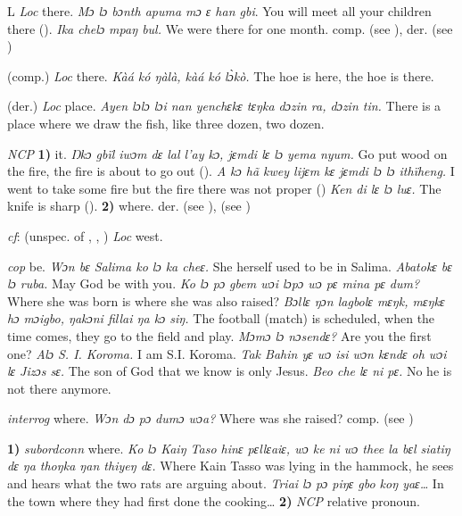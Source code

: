 \begin{letter}{L}
 \textit{Loc} there. \textit{Mɔ lɔ bɔnth apuma mɔ ɛ han gbi}. You will meet all your children there (\citealt{Pichl1967}). \textit{Ika chelɔ mpaŋ bul.} We were there for one month. comp.  (see ), der.  (see ) 

 (comp.) \textit{Loc} there. \textit{Kàá kó ŋàlà, kàá kó lɔ̀kò.} The hoe is here, the hoe is there.

 (der.) \textit{Loc} place. \textit{Ayen lɔlɔ lɔi nan yenchɛkɛ tɛŋka dɔzin ra, dɔzin tin.} There is a place where we draw the fish, like three dozen, two dozen.

 \textit{NCP} \textbf{1)} it. \textit{Ŋkɔ gbïl iwɔm dɛ lal l'ay kɔ, jɛmdi lɛ lɔ yema nyum.} Go put wood on the fire, the fire is about to go out (\citealt{Pichl1967}). \textit{A kɔ hã kwey lijɛm kɛ jɛmdi lɔ lɔ ithïheng.} I went to take some fire but the fire there was not proper (\citealt{Pichl1967}) \textit{Ken di lɛ lɔ luɛ.} The knife is sharp (\citealt{Pichl1967}). \textbf{2)} where. der.  (see ),  (see ) 

 \textit{cf}:  (unspec. of , , ) \textit{Loc} west.

 \textit{cop} be. \textit{Wɔn bɛ Salima ko lɔ ka cheɛ.} She herself used to be in Salima. \textit{Abatokɛ bɛ lɔ ruba.} May God be with you. \textit{Ko lɔ pɔ gbem wɔi lɔpɔ wɔ pɛ mina pɛ dum?} Where she was born is where she was also raised? \textit{Bɔllɛ ŋɔn lagbolɛ mɛŋk, mɛŋkɛ hɔ mɔigbo, ŋakɔni fillai ŋa kɔ siŋ.} The football (match) is scheduled, when the time comes, they go to the field and play. \textit{Mɔmɔ lɔ nɔsendɛ?} Are you the first one? \textit{Alɔ S. I. Koroma.} I am S.I. Koroma. \textit{Tak Bahin yɛ wɔ isi wɔn kɛndɛ oh wɔi lɛ Jizɔs sɛ.} The son of God that we know is only Jesus. \textit{Beo che lɛ ni pɛ.} No he is not there anymore.

 \textit{interrog} where. \textit{Wɔn dɔ pɔ dumɔ wɔa?} Where was she raised? comp.  (see ) 

 \textbf{1)} \textit{subordconn} where. \textit{Ko lɔ Kaiŋ Taso hinɛ pɛllɛaiɛ, wɔ ke ni wɔ thee la bɛl siatiŋ dɛ ŋa thoŋka ŋan thiyeŋ dɛ.} Where Kain Tasso was lying in the hammock, he sees and hears what the two rats are arguing about. \textit{Triai lɔ pɔ piŋɛ gbo koŋ yaɛ…} In the town where they had first done the cooking… \textbf{2)} \textit{NCP} relative pronoun. 


\end{letter}
